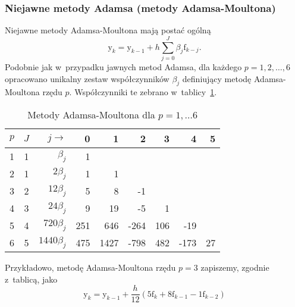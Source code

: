 \documentclass[paper=a4,DIV=12]{lpas}
\newcommand{\brm}[1]{\bm{\mathrm{#1}}}
\begin{document}
\begin{appendices}
\subsubsection{Niejawne metody Adamsa (metody Adamsa-Moultona)}
\label{sec:FYDDW}

Niejawne metody Adamsa-Moultona mają postać ogólną
\begin{equation}
  \brm{y}_k = \brm{y}_{k-1} + h \sum_{j=0}^J \beta_j \brm{f}_{k-j}.
  \label{eq:YCGME}
\end{equation}
Podobnie jak w~przypadku jawnych metod Adamsa, dla każdego $p=1,2,\dots,6$
opracowano unikalny zestaw współczynników $\beta_j$ definiujący metodę
Adamsa-Moultona rzędu $p$. Współczynniki te zebrano w~tablicy~\ref{tab:06769}.
\begin{table}[htbp]
  \caption{Metody Adamsa-Moultona dla $p=1,\dots6$}
  \label{tab:06769}
  \centering
  \begin{tabular}{|c|c|r|r|r|r|r|r|r|}
    \hline
    $p$ & $J$ & $j \rightarrow$ &    0 &    1 &    2 &    3 &    4 &    5 \\ \hline
     1  &  1  &   $\beta_j$     &    1 &      &      &      &      &      \\
     2  &  1  &   $2\beta_j$    &    1 &    1 &      &      &      &      \\
     3  &  2  &  $12\beta_j$    &    5 &    8 &   -1 &      &      &      \\
     4  &  3  &  $24\beta_j$    &    9 &   19 &   -5 &    1 &      &      \\
     5  &  4  & $720\beta_j$    &  251 &  646 & -264 &  106 &  -19 &      \\
     6  &  5  &$1440\beta_j$    &  475 & 1427 & -798 &  482 & -173 &   27 \\ \hline
  \end{tabular}
\end{table}
Przykładowo, metodę Adamsa-Moultona rzędu $p=3$ zapiszemy, zgodnie z~tablicą,
jako
\begin{equation}
  \brm{y}_k = \brm{y}_{k-1} + \frac{h}{12}\left(
    5 \brm{f}_k + 8 \brm{f}_{k-1} - 1 \brm{f}_{k-2}
  \right)
\end{equation}


\end{appendices}
\end{document}
